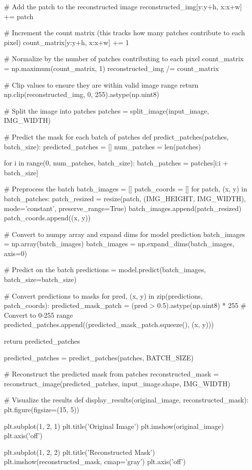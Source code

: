 \documentclass[conference]{IEEEtran}
\begin{document}
# Add the patch to the reconstructed image
reconstructed_img[y:y+h, x:x+w] += patch

# Increment the count matrix (this tracks how many patches contribute to each pixel)
count_matrix[y:y+h, x:x+w] += 1

# Normalize by the number of patches contributing to each pixel
count_matrix = np.maximum(count_matrix, 1)
reconstructed_img /= count_matrix

# Clip values to ensure they are within valid image range
return np.clip(reconstructed_img, 0, 255).astype(np.uint8)

# Split the image into patches
patches = split_image(input_image, IMG_WIDTH)

# Predict the mask for each batch of patches
def predict_patches(patches, batch_size):
predicted_patches = []
num_patches = len(patches)

for i in range(0, num_patches, batch_size):
batch_patches = patches[i:i + batch_size]

# Preprocess the batch
batch_images = []
patch_coords = []
for patch, (x, y) in batch_patches:
patch_resized = resize(patch, (IMG_HEIGHT, IMG_WIDTH), mode='constant', preserve_range=True)
batch_images.append(patch_resized)
patch_coords.append((x, y))

# Convert to numpy array and expand dims for model prediction
batch_images = np.array(batch_images)
batch_images = np.expand_dims(batch_images, axis=0)

# Predict on the batch
predictions = model.predict(batch_images, batch_size=batch_size)

# Convert predictions to masks
for pred, (x, y) in zip(predictions, patch_coords):
predicted_mask_patch = (pred > 0.5).astype(np.uint8) * 255  # Convert to 0-255 range
predicted_patches.append((predicted_mask_patch.squeeze(), (x, y)))

return predicted_patches

predicted_patches = predict_patches(patches, BATCH_SIZE)

# Reconstruct the predicted mask from patches
reconstructed_mask = reconstruct_image(predicted_patches, input_image.shape, IMG_WIDTH)

# Visualize the results
def display_results(original_image, reconstructed_mask):
plt.figure(figsize=(15, 5))

plt.subplot(1, 2, 1)
plt.title('Original Image')
plt.imshow(original_image)
plt.axis('off')

plt.subplot(1, 2, 2)
plt.title('Reconstructed Mask')
plt.imshow(reconstructed_mask, cmap='gray')
plt.axis('off')
\end{document}
